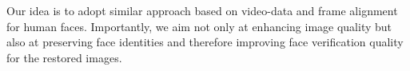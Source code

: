 Our idea is to adopt similar approach based on video-data and frame alignment for human faces. Importantly, we aim not only at enhancing image quality but also at preserving face identities and therefore improving face verification quality for the restored images.
 
   












